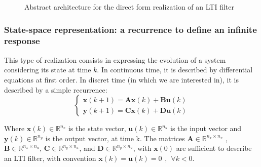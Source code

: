 \begin{figure*}[h]

\caption{Abstract architecture for the direct form realization of an LTI filter \label{fig:ltiarch}}
\end{figure*}

	\subsubsection{State-space representation: a recurrence to define an infinite response}
	This type of realization consists in expressing the evolution of a system considering its state at time $k$. In
	continuous time, it is described by differential equations at first order. In discret time (in which we
	are interested in), it is described by a simple recurrence:
	\begin{equation} \label{abcddef}
		\begin{cases}
			\boldsymbol{x}(k+1)= \boldsymbol{Ax}(k) + \boldsymbol{Bu}(k) \\
			\boldsymbol{y}(k+1)= \boldsymbol{Cx}(k) + \boldsymbol{Du}(k)
		\end{cases}
	\end{equation}

	Where $\boldsymbol{x}(k) \in \mathbb{R}^{n_x}$ is the state vector,
	$\boldsymbol{u}(k) \in \mathbb{R}^{n_u}$ is the input vector and
	$\boldsymbol{y}(k) \in \mathbb{R}^{n_y}$ is the output vector, at time k.
	The matrices $\boldsymbol{A} \in \mathbb{R}^{n_x \times n_x}$ , $\boldsymbol{B} \in \mathbb{R}^{n_x \times n_u}$,
	$\boldsymbol{C} \in \mathbb{R}^{n_y \times n_x}$, and $\boldsymbol{D} \in \mathbb{R}^{n_y \times n_u}$,
	with $\boldsymbol{x}(0)$ are sufficient to describe an LTI filter, with convention $\boldsymbol{x}(k)=\boldsymbol{u}(k)=0 \hspace{5pt}, \hspace{5pt} \forall k<0$.

